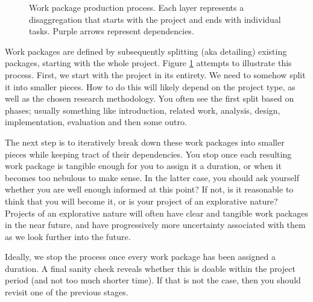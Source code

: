 \documentclass[a4paper, oneside]{memoir}
\newcommand{\idxx}[2]{\index{#1}\marginpar{\raggedright \tiny #2}}
\begin{document}
\begin{figure}[tbp]
\begin{center}
{
    }
  \end{center}
  \caption[Work package production process]{Work package production process. Each layer represents a disaggregation that starts with the project and ends with individual tasks. Purple arrows represent dependencies.}
  \label{fig:pm:wp:disagg}
\end{figure}

Work packages are defined by subsequently splitting (aka detailing) existing packages, starting with the whole project. Figure \ref{fig:pm:wp:disagg} attempts to illustrate this process. First, we start with the project in its entirety. We need to somehow split it into smaller pieces. How to do this will likely depend on the project type, as well as the chosen research methodology. You often see the first split based on phases; usually something like introduction, related work, analysis, design, implementation, evaluation and then some outro.

The next step is to iteratively break down these work packages into smaller pieces while keeping tract of their dependencies. You stop once each resulting work package is tangible enough for you to assign it a duration, or when it becomes too nebulous to make sense. In the latter case, you should ask yourself whether you are well enough informed at this point? If not, is it reasonable to think that you will become it, or is your project\idxx{Project!explorative}{Explorative project} of an explorative nature? Projects of an explorative nature will often have clear and tangible work packages in the near future, and have progressively more uncertainty associated with them as we look further into the future.

Ideally, we stop the process once every work package has been assigned a duration. A final sanity check reveals whether this is doable within the project period (and not too much shorter time). If that is not the case, then you should revisit one of the previous stages.
\end{document}
